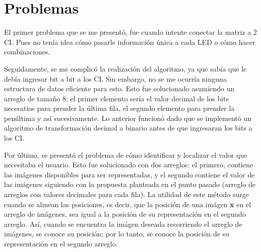 \documentclass{article}
\begin{document}
\section{Problemas}
El primer problema que se me presentó, fue cuando intente conectar la matriz a 2 CI. Pues no tenía idea cómo pasarle información única a cada LED o cómo hacer combinaciones.\par Seguidamente, se me complicó la realización del algoritmo, ya que sabía que le debía ingresar bit a bit a los CI. Sin embargo, no se me ocurría ninguna estructura de datos eficiente para esto. Esto fue solucionado asumiendo un arreglo de tamaño 8: el primer elemento sería el valor decimal de los bits necesatios para prender la última fila, el segundo elemento para prender la penúltima y así sucesivamente. Lo anterior funcionó dado que se implementó un algoritmo de transformación decimal a binario antes de que ingresaran los bits a los CI.\par Por último, se presentó el problema de cómo identificar y localizar el valor que necesitaba el usuario. Esto fue solucionado con dos arreglos: el primero, contiene las imágenes disponibles para ser representadas, y el segundo contiene el valor de las imágenes siguiendo con la propuesta planteada en el punto pasado (arreglo de arreglos con valores decimales para cada fila). La utilidad de este método surge cuando se alinean las posiciones, es decir, que la posición de una imágen \textbf{x} en el arreglo de imágenes, sea igual a la posición de su representación en el segundo arreglo. Así, cuando se encuentra la imágen deseada recorriendo el arreglo de imágenes, se conoce su posición; por lo tanto, se conoce la posición de su representación en el segundo arreglo.
\end{document}
